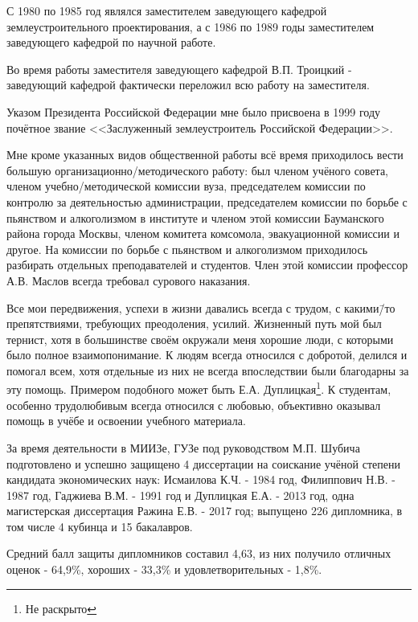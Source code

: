 С 1980 по 1985 год являлся заместителем заведующего кафедрой землеустроительного проектирования, а с 1986 по 1989 годы заместителем заведующего кафедрой по научной работе.

Во время работы заместителя заведующего кафедрой В.П. Троицкий - заведующий кафедрой фактически переложил всю работу на заместителя.

Указом Президента Российской Федерации мне было присвоена в 1999 году почётное звание <<Заслуженный землеустроитель Российской Федерации>>. 

Мне кроме указанных видов общественной работы всё время приходилось вести большую организационно\-/методического работу: был членом учёного совета, членом учебно\-/методической комиссии вуза, председателем комиссии по контролю за деятельностью администрации, председателем комиссии по борьбе с пьянством и алкоголизмом в институте и членом этой комиссии Бауманского района города Москвы, членом комитета комсомола, эвакуационной комиссии и другое. На комиссии по борьбе с пьянством и алкоголизмом приходилось разбирать отдельных преподавателей и студентов. Член этой комиссии профессор А.В. Маслов всегда требовал сурового наказания.

Все мои передвижения, успехи в жизни давались всегда с трудом, с какими\=/то препятствиями, требующих преодоления, усилий. Жизненный путь мой был тернист, хотя в большинстве своём окружали меня хорошие люди, с которыми было полное взаимопонимание. К людям всегда относился с добротой, делился и помогал всем, хотя отдельные из них не всегда впоследствии были благодарны за эту помощь. Примером подобного может быть Е.А. Дуплицкая\footnote{Не раскрыто}. К студентам, особенно трудолюбивым всегда относился с любовью, объективно оказывал помощь в учёбе и освоении учебного материала.

За время деятельности в МИИЗе, ГУЗе под руководством М.П. Шубича подготовлено и успешно защищено 4 диссертации на соискание учёной степени кандидата экономических наук: Исмаилова К.Ч. - 1984 год, Филиппович Н.В. - 1987 год, Гаджиева В.М. - 1991 год и Дуплицкая Е.А. - 2013 год, одна магистерская диссертация Ражина Е.В. - 2017 год; выпущено 226 дипломника, в том числе 4 кубинца и 15 бакалавров.

Средний балл защиты дипломников составил 4,63, из них получило отличных оценок - 64,9\%, хороших - 33,3\% и удовлетворительных - 1,8\%.


